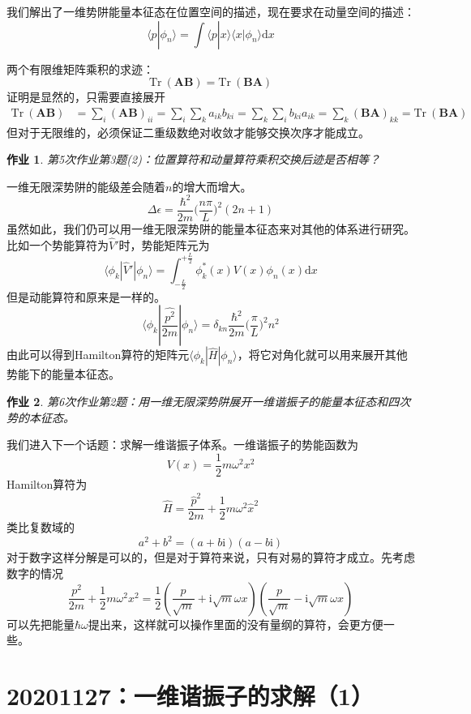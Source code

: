 \documentclass[12pt]{article}
\newtheorem{asg}{作业}
\begin{document}
我们解出了一维势阱能量本征态在位置空间的描述，现在要求在动量空间的描述：
\[ \langle p|\phi_n \rangle = \int \langle p|x \rangle \langle x |\phi_n \rangle \mathrm{d}x \]

两个有限维矩阵乘积的求迹：
\begin{equation*}
    \mathrm{Tr} \ (\bm{AB}) = \mathrm{Tr} \ (\bm{BA})
\end{equation*}
证明是显然的，只需要直接展开
\begin{align*}
    \mathrm{Tr} \ (\bm{AB}) &= \sum_i (\bm{AB})_{ii}
    = \sum_i \sum_k a_{ik}b_{ki}
    = \sum_k \sum_i b_{ki}a_{ik}
    = \sum_k \bm{(BA)}_{kk}
    = \mathrm{Tr} \ (\bm{BA})
\end{align*}
但对于无限维的，必须保证二重级数绝对收敛才能够交换次序才能成立。
\begin{asg}
    第5次作业第3题(2)：位置算符和动量算符乘积交换后迹是否相等？
\end{asg}

一维无限深势阱的能级差会随着$n$的增大而增大。
\[ \Delta \epsilon = \frac {\hbar^2}{2m} \bigg(\frac {n\pi}L \bigg)^2 (2n+1) \]
虽然如此，我们仍可以用一维无限深势阱的能量本征态来对其他的体系进行研究。比如一个势能算符为$\hat{V}'$时，势能矩阵元为
\[
    \langle \phi_k | \hat{V}' | \phi_n \rangle = \int_{-\frac L2}^{+\frac L2} \phi_k^*(x) V(x) \phi_n(x) \mathrm{d}x 
\]
但是动能算符和原来是一样的。
\[
    \langle \phi_k | \frac {\hat{p^2}}{2m} | \phi_n \rangle = \delta_{kn} \frac {\hbar^2}{2m} \bigg( \frac {\pi}L \bigg)^2 n^2
\]
由此可以得到Hamilton算符的矩阵元$\langle \phi_k | \hat{H} | \phi_n \rangle$，将它对角化就可以用来展开其他势能下的能量本征态。
\begin{asg}
    第6次作业第2题：用一维无限深势阱展开一维谐振子的能量本征态和四次势的本征态。
\end{asg}

我们进入下一个话题：求解一维谐振子体系。一维谐振子的势能函数为
\[ V(x) = \frac 12 m\omega^2x^2 \]
Hamilton算符为
\[ \hat{H} = \frac {\hat{p}^2}{2m} + \frac 12 m\omega^2 \hat{x}^2 \]
类比复数域的
\[ a^2 + b^2 = (a+b\mathrm{i})(a-b\mathrm{i}) \]
对于数字这样分解是可以的，但是对于算符来说，只有对易的算符才成立。先考虑数字的情况
\[ \frac {p^2}{2m} + \frac 12 m\omega^2 x^2 = \frac 12 (\frac p{\sqrt{m}} + \mathrm{i}\sqrt{m}\omega x)(\frac p{\sqrt{m}} - \mathrm{i}\sqrt{m}\omega x) \]
可以先把能量$\hbar \omega$提出来，这样就可以操作里面的没有量纲的算符，会更方便一些。

\section{20201127：一维谐振子的求解（1）}
\end{document}
